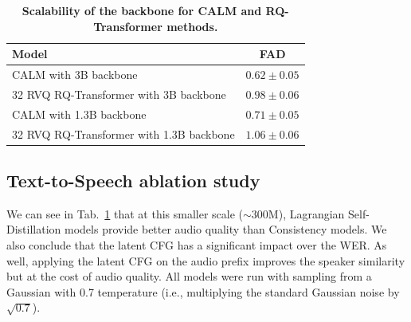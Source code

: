 \begin{table}[h]
\centering
\caption{\textbf{Scalability of the backbone for CALM and RQ-Transformer methods.}}
\begin{tabular}{lc}
\toprule
\textbf{Model} & \textbf{FAD} \\
\midrule
CALM with 3B backbone & $0.62 \pm 0.05$ \\
32 RVQ RQ-Transformer with 3B backbone & $0.98 \pm 0.06$ \\
CALM with 1.3B backbone & $0.71 \pm 0.05$ \\
32 RVQ RQ-Transformer with 1.3B backbone & $1.06 \pm 0.06$ \\
\bottomrule
\end{tabular}
\label{tab:scalability}
\end{table}


\subsection{Text-to-Speech ablation study}


We can see in Tab.~\ref{tab:scalability} that at this smaller scale ($\sim$300M), Lagrangian Self-Distillation models provide better audio quality than Consistency models. We also conclude that the latent CFG has a significant impact over the WER. As well, applying the latent CFG on the audio prefix improves the speaker similarity but at the cost of audio quality.
All models were run with sampling from a Gaussian with 0.7 temperature (i.e., multiplying the standard Gaussian noise by $\sqrt{0.7}$).

